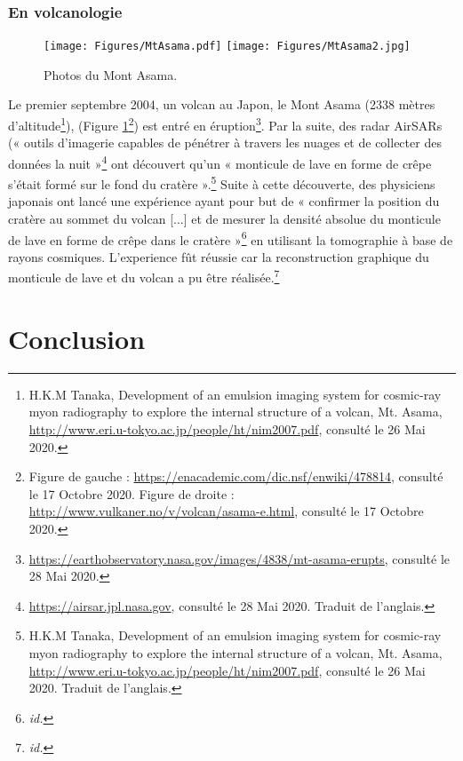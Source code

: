 \documentclass[a4paper, 12pt]{article}
\begin{document}
\begin{spacing}{1.5}
\subsubsection{En volcanologie}

\begin{figure}[t]
\begin{center}
\texttt{[image: Figures/MtAsama.pdf]}
\texttt{[image: Figures/MtAsama2.jpg]}
\caption{\label{fig:Asama}Photos du Mont Asama.}
\end{center}
\end{figure}

Le premier septembre 2004, un volcan au Japon, le Mont Asama (2338 mètres d'altitude\footnote{H.K.M Tanaka, Development of an emulsion imaging system for cosmic-ray myon radiography to explore the internal structure of a volcan, Mt. Asama, \url{http://www.eri.u-tokyo.ac.jp/people/ht/nim2007.pdf}, consulté le 26 Mai 2020.}), (Figure \ref{fig:Asama}\footnote{Figure de gauche : \url{https://enacademic.com/dic.nsf/enwiki/478814}, consulté le 17 Octobre 2020. Figure de droite : \url{http://www.vulkaner.no/v/volcan/asama-e.html}, consulté le 17 Octobre 2020.}) est entré en éruption\footnote{\url{https://earthobservatory.nasa.gov/images/4838/mt-asama-erupts}, consulté le 28 Mai 2020.}. Par la suite, des radar AirSARs (« outils d'imagerie capables de pénétrer à travers les nuages et de collecter des données la nuit »\footnote{\url{https://airsar.jpl.nasa.gov}, consulté le 28 Mai 2020. Traduit de l'anglais.} ont découvert qu'un « monticule de lave en forme de crêpe s'était formé sur le fond du cratère ».\footnote{H.K.M Tanaka, Development of an emulsion imaging system for cosmic-ray myon radiography to explore the internal structure of a volcan, Mt. Asama, \url{http://www.eri.u-tokyo.ac.jp/people/ht/nim2007.pdf}, consulté le 26 Mai 2020. Traduit de l'anglais.} Suite à cette découverte, des physiciens japonais ont lancé une expérience ayant pour but de « confirmer la position du cratère au sommet du volcan [...] et de mesurer la densité absolue du monticule de lave en forme de crêpe dans le cratère »\footnote{\emph{id.}} en utilisant la tomographie à base de rayons cosmiques. L'experience fût réussie car la reconstruction graphique du monticule de lave et du volcan a pu être réalisée.\footnote{\emph{id.}}


\pagebreak

\section{Conclusion}


\end{spacing}
\end{document}
